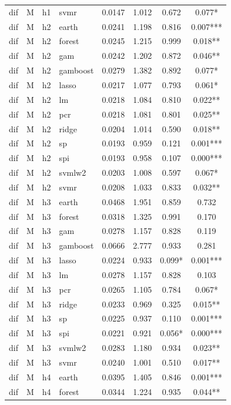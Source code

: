\begin{ThreePartTable}
\begin{longtable}[t]{llclcccc}
dif & M & h1 & svmr & 0.0147 & 1.012 & 0.672 & 0.077*\\
\addlinespace
dif & M & h2 & earth & 0.0241 & 1.198 & 0.816 & 0.007***\\
dif & M & h2 & forest & 0.0245 & 1.215 & 0.999 & 0.018**\\
dif & M & h2 & gam & 0.0242 & 1.202 & 0.872 & 0.046**\\
dif & M & h2 & gamboost & 0.0279 & 1.382 & 0.892 & 0.077*\\
dif & M & h2 & lasso & 0.0217 & 1.077 & 0.793 & 0.061*\\
dif & M & h2 & lm & 0.0218 & 1.084 & 0.810 & 0.022**\\
dif & M & h2 & pcr & 0.0218 & 1.081 & 0.801 & 0.025**\\
dif & M & h2 & ridge & 0.0204 & 1.014 & 0.590 & 0.018**\\
dif & M & h2 & sp & 0.0193 & 0.959 & 0.121 & 0.001***\\
dif & M & h2 & spi & 0.0193 & 0.958 & 0.107 & 0.000***\\
dif & M & h2 & svmlw2 & 0.0203 & 1.008 & 0.597 & 0.067*\\
dif & M & h2 & svmr & 0.0208 & 1.033 & 0.833 & 0.032**\\
\addlinespace
dif & M & h3 & earth & 0.0468 & 1.951 & 0.859 & 0.732\\
dif & M & h3 & forest & 0.0318 & 1.325 & 0.991 & 0.170\\
dif & M & h3 & gam & 0.0278 & 1.157 & 0.828 & 0.119\\
dif & M & h3 & gamboost & 0.0666 & 2.777 & 0.933 & 0.281\\
dif & M & h3 & lasso & 0.0224 & 0.933 & 0.099* & 0.001***\\
dif & M & h3 & lm & 0.0278 & 1.157 & 0.828 & 0.103\\
dif & M & h3 & pcr & 0.0265 & 1.105 & 0.784 & 0.067*\\
dif & M & h3 & ridge & 0.0233 & 0.969 & 0.325 & 0.015**\\
dif & M & h3 & sp & 0.0225 & 0.937 & 0.110 & 0.001***\\
dif & M & h3 & spi & 0.0221 & 0.921 & 0.056* & 0.000***\\
dif & M & h3 & svmlw2 & 0.0283 & 1.180 & 0.934 & 0.023**\\
dif & M & h3 & svmr & 0.0240 & 1.001 & 0.510 & 0.017**\\
\addlinespace
dif & M & h4 & earth & 0.0395 & 1.405 & 0.846 & 0.001***\\
dif & M & h4 & forest & 0.0344 & 1.224 & 0.935 & 0.044**\\

\end{longtable}
\end{ThreePartTable}
